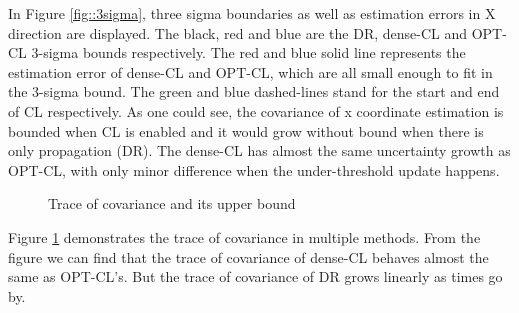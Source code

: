 \documentclass[conference]{IEEEtran}
\begin{document}
In Figure \ref{fig::3sigma}, three sigma boundaries as well as estimation errors in X direction are displayed.
The black, red and blue are the DR, dense-CL and OPT-CL 3-sigma bounds respectively. The red and blue solid line represents the estimation error of dense-CL and OPT-CL, which are all small enough to fit in the 3-sigma bound.
The green and blue dashed-lines stand for the start and end of CL respectively.
As one could see, the covariance of x coordinate estimation is bounded when CL is enabled and it would grow without bound when there is only propagation (DR).
The dense-CL has almost the same uncertainty growth as OPT-CL, with only minor difference when the under-threshold update happens.
\begin{figure}
	\centering
	\caption{Trace of covariance and its upper bound}
	\label{fig::trace}
\end{figure}

Figure \ref{fig::trace} demonstrates the trace of covariance in multiple methods.
From the figure we can find that the trace of covariance of dense-CL behaves almost the same as OPT-CL's. But the trace of covariance of DR grows linearly as times go by.
\end{document}
